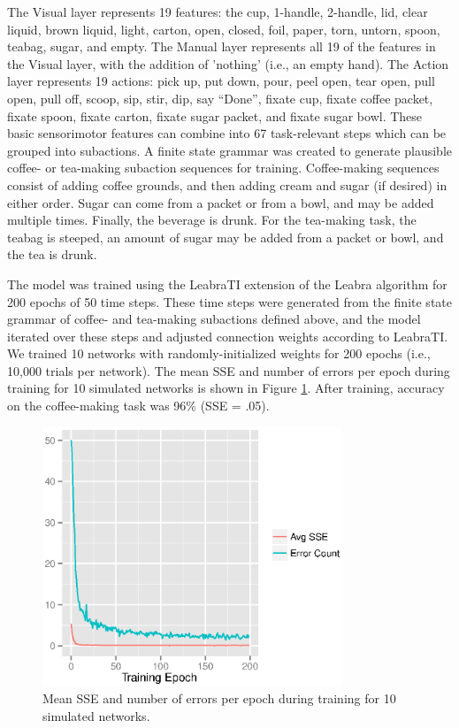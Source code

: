 \documentclass[10pt,letterpaper]{article}
\numberwithin{equation}{section}
\begin{document}
The Visual layer represents 19 features: the cup, 1-handle, 2-handle, lid, clear liquid, brown liquid, light, carton, open, closed, foil, paper, torn, untorn, spoon, teabag, sugar, and empty. The Manual layer represents all 19 of the features in the Visual layer, with the addition of 'nothing' (i.e., an empty hand). The Action layer represents 19 actions: pick up, put down, pour, peel open, tear open, pull open, pull off, scoop, sip, stir, dip, say ``Done'', fixate cup, fixate coffee packet, fixate spoon, fixate carton, fixate sugar packet, and fixate sugar bowl. These basic sensorimotor features can combine into 67 task-relevant steps which can be grouped into subactions. A finite state grammar was created to generate plausible coffee- or tea-making subaction sequences for training. Coffee-making sequences consist of adding coffee grounds, and then adding cream and sugar (if desired) in either order. Sugar can come from a packet or from a bowl, and may be added multiple times. Finally, the beverage is drunk. For the tea-making task, the teabag is steeped, an amount of sugar may be added from a packet or bowl, and the tea is drunk.

The model was trained using the LeabraTI extension of the Leabra algorithm for 200 epochs of 50 time steps. These time steps were generated from the finite state grammar of coffee- and tea-making subactions defined above, and the model iterated over these steps and adjusted connection weights according to LeabraTI. We trained 10 networks with randomly-initialized weights for 200 epochs (i.e., 10,000 trials per network). The mean SSE and number of errors per epoch during training for 10 simulated networks is shown in Figure \ref{fig:epochs}.  After training, accuracy on the coffee-making task was 96\% (SSE = .05). 

\begin{figure}
  \centering
  \includegraphics[width=0.8\textwidth]{SSE_and_errors_vs_epoch}
  \caption{Mean SSE and number of errors per epoch during training for 10 simulated networks.}
  \label{fig:epochs}
\end{figure}
\end{document}
